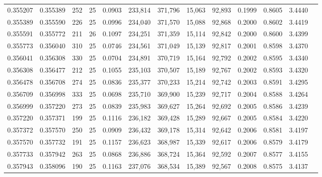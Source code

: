 \begin{tabular}{rrrrrrrrrrrrr}
0.355207 & 0.355389 &   252 &  25 &                                     0.0903 & 233,814 & 371,796 &  15,063 &  92,893 & 0.1999 & 0.8605 & 3.4440 \\
0.355389 & 0.355590 &   226 &  25 &                                     0.0996 & 234,040 & 371,570 &  15,088 &  92,868 & 0.2000 & 0.8602 & 3.4419 \\
0.355591 & 0.355772 &   211 &  26 &                                     0.1097 & 234,251 & 371,359 &  15,114 &  92,842 & 0.2000 & 0.8600 & 3.4399 \\
0.355773 & 0.356040 &   310 &  25 &                                     0.0746 & 234,561 & 371,049 &  15,139 &  92,817 & 0.2001 & 0.8598 & 3.4370 \\
0.356041 & 0.356308 &   330 &  25 &                                     0.0704 & 234,891 & 370,719 &  15,164 &  92,792 & 0.2002 & 0.8595 & 3.4340 \\
0.356308 & 0.356477 &   212 &  25 &                                     0.1055 & 235,103 & 370,507 &  15,189 &  92,767 & 0.2002 & 0.8593 & 3.4320 \\
0.356478 & 0.356708 &   274 &  25 &                                     0.0836 & 235,377 & 370,233 &  15,214 &  92,742 & 0.2003 & 0.8591 & 3.4295 \\
0.356709 & 0.356998 &   333 &  25 &                                     0.0698 & 235,710 & 369,900 &  15,239 &  92,717 & 0.2004 & 0.8588 & 3.4264 \\
0.356999 & 0.357220 &   273 &  25 &                                     0.0839 & 235,983 & 369,627 &  15,264 &  92,692 & 0.2005 & 0.8586 & 3.4239 \\
0.357220 & 0.357371 &   199 &  25 &                                     0.1116 & 236,182 & 369,428 &  15,289 &  92,667 & 0.2005 & 0.8584 & 3.4220 \\
0.357372 & 0.357570 &   250 &  25 &                                     0.0909 & 236,432 & 369,178 &  15,314 &  92,642 & 0.2006 & 0.8581 & 3.4197 \\
0.357570 & 0.357732 &   191 &  25 &                                     0.1157 & 236,623 & 368,987 &  15,339 &  92,617 & 0.2006 & 0.8579 & 3.4179 \\
0.357733 & 0.357942 &   263 &  25 &                                     0.0868 & 236,886 & 368,724 &  15,364 &  92,592 & 0.2007 & 0.8577 & 3.4155 \\
0.357943 & 0.358096 &   190 &  25 &                                     0.1163 & 237,076 & 368,534 &  15,389 &  92,567 & 0.2008 & 0.8575 & 3.4137 \\

\end{tabular}
